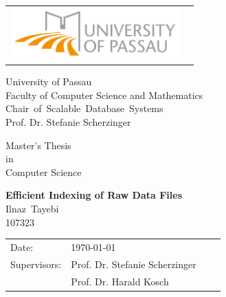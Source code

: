 \documentclass[fontsize=10pt,openright,oneside,paper=a4,BCOR=1cm,numbers=noenddot,english]{scrbook}
\newcommand{\authornamefirst}{Ilnaz}
\newcommand{\authornamelast}{Tayebi}
\newcommand{\matrikelnummer}{107323}
\newcommand{\worktitle}{Efficient Indexing of Raw Data Files}
\newcommand{\thesistype}{Master's Thesis}
\newcommand{\courseofstudies}{Computer Science}
\newcommand{\thesisdate}{\today}   %
\newcommand{\thesisprof}{Prof. Dr. Stefanie Scherzinger}
\newcommand{\thesisproftwo}{Prof. Dr. Harald Kosch}
\newcommand{\chair}{\mbox{Chair of Scalable Database Systems}}
\let\epsilon\varepsilon
\begin{document}
\frontmatter
\thispagestyle{empty}
\newpage

\vspace{1cm}

\begin{center}
\begin{tabular}{lr}
\includegraphics[width=6.5cm]{img/logouni_en.png}
\end{tabular}

\vspace{3cm}
\Large University of Passau
\\
\Large Faculty of Computer Science and Mathematics
\\
\vspace{0.3cm}
\Large {\chair }
\\
\Large \thesisprof

\end{center}


\vspace{2.5cm}

\begin{center}
        {\Large \thesistype\\ in\\ \courseofstudies\\} 
\end{center}

\begin{center}
        \settowidth{\baselineskip}{0.4cm}
        {\LARGE \textbf{\worktitle}}
        \\
        {\Large
        \vspace{1cm}
        \authornamefirst~\authornamelast \\ \matrikelnummer \\
        }
\end{center}

\vfill {%

\vfill


{\large
\begin{tabular}[l]{llll}

Date:       & \thesisdate %
\smallskip \\
Supervisors:   & \thesisprof \\ %
	& \thesisproftwo \\
\end{tabular}}
} \cleardoublepage

\end{document}
